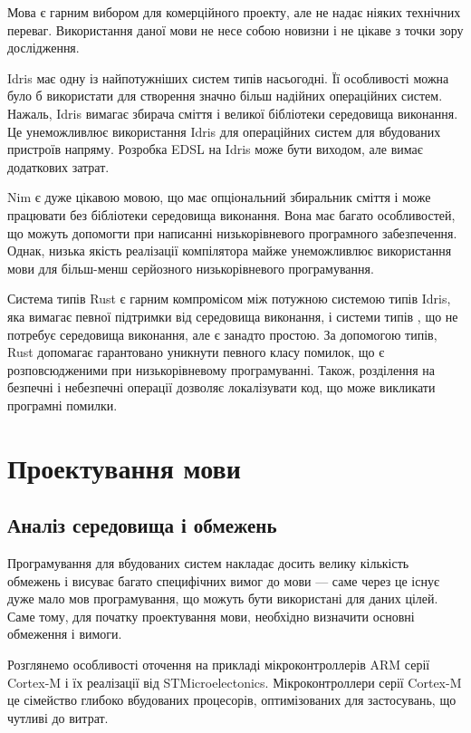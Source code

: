 \documentclass[main.tex]{subfiles}
\begin{document}
Мова \LangC{} є гарним вибором для комерційного проекту, але не надає ніяких технічних переваг. Використання даної мови не несе собою новизни і не цікаве з точки зору дослідження.

Idris має одну із найпотужніших систем типів насьогодні. Її особливості можна було б використати для створення значно більш надійних операційних систем. Нажаль, Idris вимагає збирача сміття і великої бібліотеки середовища виконання. Це унеможливлює використання Idris для операційних систем для вбудованих пристроїв напряму. Розробка EDSL на Idris може бути виходом, але вимає додаткових затрат.

Nim є дуже цікавою мовою, що має опціональний збиральник сміття і може працювати без бібліотеки середовища виконання. Вона має багато особливостей, що можуть допомогти при написанні низькорівневого програмного забезпечення. Однак, низька якість реалізації компілятора майже унеможливлює використання мови для більш-менш серйозного низькорівневого програмування.

Система типів Rust є гарним компромісом між потужною системою типів Idris, яка вимагає певної підтримки від середовища виконання, і системи типів \LangC{}, що не потребує середовища виконання, але є занадто простою. За допомогою типів, Rust допомагає гарантовано уникнути певного класу помилок, що є розповсюдженими при низькорівневому програмуванні. Також, розділення на безпечні і небезпечні операції дозволяє локалізувати код, що може викликати програмні помилки.

\chapter{Проектування мови}
\section{Аналіз середовища і обмежень}
Програмування для вбудованих систем накладає досить велику кількість обмежень і висуває багато специфічних вимог до мови --- саме через це існує дуже мало мов програмування, що можуть бути використані для даних цілей.
Саме тому, для початку проектування мови, необхідно визначити основні обмеження і вимоги.

Розглянемо особливості оточення на прикладі мікроконтроллерів ARM серії Cortex-M\cite{cortex-m} і їх реалізації від STMicroelectonics\cite{cortex-m:stm}. Мікроконтроллери серії Cortex-M це сімейство глибоко вбудованих процесорів, оптимізованих для застосувань, що чутливі до витрат.
\end{document}
